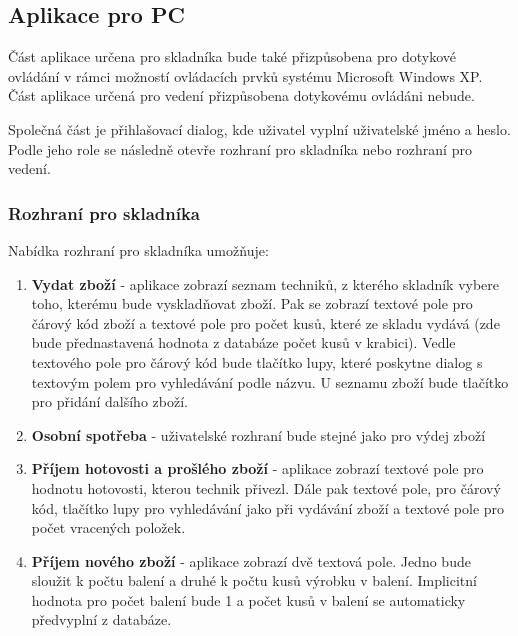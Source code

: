 \documentclass[a4paper,10pt]{article}
\begin{document}
\subsection{Aplikace pro PC}

Část aplikace určena pro skladníka bude také přizpůsobena pro dotykové ovládání v rámci možností ovládacích prvků systému Microsoft Windows XP. Část aplikace určená pro vedení přizpůsobena dotykovému ovládáni nebude.

Společná část je přihlašovací dialog, kde uživatel vyplní uživatelské jméno a heslo. Podle jeho role se následně otevře rozhraní pro skladníka nebo rozhraní pro vedení.

\subsubsection{Rozhraní pro skladníka}
Nabídka rozhraní pro skladníka umožňuje:
\begin{enumerate}
	\item \textbf{Vydat zboží} - aplikace zobrazí seznam techniků, z kterého skladník vybere toho, kterému bude vyskladňovat zboží. Pak se zobrazí textové pole pro čárový kód zboží a textové pole pro počet kusů, které ze skladu vydává (zde bude přednastavená hodnota z databáze počet kusů v krabici). Vedle textového pole pro čárový kód bude tlačítko lupy, které poskytne dialog s textovým polem pro vyhledávání podle názvu. U seznamu zboží bude tlačítko pro přidání dalšího zboží.
	\item \textbf{Osobní spotřeba} - uživatelské rozhraní bude stejné jako pro výdej zboží
	\item \textbf{Příjem hotovosti a prošlého zboží} - aplikace zobrazí textové pole pro hodnotu hotovosti, kterou technik přivezl. Dále pak textové pole, pro čárový kód, tlačítko lupy pro vyhledávání jako při vydávání zboží a textové pole pro počet vracených položek.
	\item \textbf{Příjem nového zboží} - aplikace zobrazí dvě textová pole. Jedno bude sloužit k počtu balení a druhé k počtu kusů výrobku v balení. Implicitní hodnota pro počet balení bude 1 a počet kusů v balení se automaticky předvyplní z databáze.
\end{enumerate}
\end{document}
